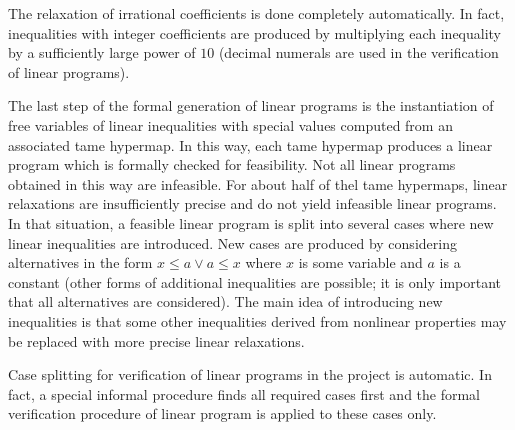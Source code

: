 The relaxation of irrational coefficients is done completely
automatically. In fact, inequalities with integer coefficients are
produced by multiplying each inequality by a sufficiently large power
of $10$ (decimal numerals are used in the verification of linear
programs).

The last step of the formal generation of linear programs is the
instantiation of free variables of linear inequalities with special
values computed from an associated tame hypermap. In this way, each
tame hypermap produces a linear program which is formally checked for
feasibility. Not all linear programs obtained in this way are
infeasible.  For about half of thel tame hypermaps, linear relaxations
are insufficiently precise and do not yield infeasible linear
programs.  In that situation, a feasible linear program is split into
several cases where new linear inequalities are introduced. New cases
are produced by considering alternatives in the form $x \le a \vee a
\le x$ where $x$ is some variable and $a$ is a constant (other forms
of additional inequalities are possible; it is only important that all
alternatives are considered). The main idea of introducing new
inequalities is that some other inequalities derived from nonlinear
properties may be replaced with more precise linear relaxations.

Case splitting for verification of linear programs in the project is
automatic. In fact, a special informal procedure finds all required
cases first and the formal verification procedure of linear program is
applied to these cases only.

